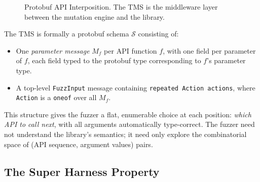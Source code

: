 \documentclass[sigconf,anonymous]{acmart}
\begin{document}
\begin{figure}[h]
\centering
{}
\caption{Protobuf API Interposition.  The TMS is the middleware layer
  between the mutation engine and the library.}
\label{fig:pai}
\end{figure}

The TMS is formally a protobuf schema $\mathcal{S}$ consisting of:
\begin{itemize}
  \item One \emph{parameter message} $M_f$ per API function $f$, with
    one field per parameter of $f$, each field typed to the protobuf
    type corresponding to $f$'s parameter type.
  \item A top-level \texttt{FuzzInput} message containing
    \texttt{repeated Action actions}, where \texttt{Action} is a
    \texttt{oneof} over all $M_f$.
\end{itemize}

This structure gives the fuzzer a flat, enumerable choice at each
position: \emph{which API to call next}, with all arguments
automatically type-correct.  The fuzzer need not understand the
library's semantics; it need only explore the combinatorial space of
(API sequence, argument values) pairs.

\subsection{The Super Harness Property}
\end{document}
